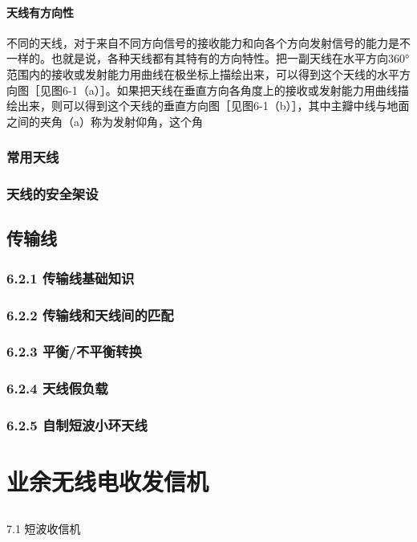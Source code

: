 \documentclass[12pt,UTF8]{ctexbook}
\begin{document}
\subsubsection{天线有方向性}

不同的天线，对于来自不同方向信号的接收能力和向各个方向发射信号的能力是不一样的。也就是说，各种天线都有其特有的方向特性。把一副天线在水平方向360°范围内的接收或发射能力用曲线在极坐标上描绘出来，可以得到这个天线的水平方向图［见图6-1（a）］。如果把天线在垂直方向各角度上的接收或发射能力用曲线描绘出来，则可以得到这个天线的垂直方向图［见图6-1（b）］，其中主瓣中线与地面之间的夹角（a）称为发射仰角，这个角

\subsection{常用天线}
\subsection{天线的安全架设}



\section{传输线}
\subsection{6.2.1 传输线基础知识}
\subsection{6.2.2 传输线和天线间的匹配}
\subsection{6.2.3 平衡/不平衡转换}
\subsection{6.2.4 天线假负载}
\subsection{6.2.5 自制短波小环天线}

\chapter{业余无线电收发信机}

\section{}7.1 短波收信机
\end{document}
